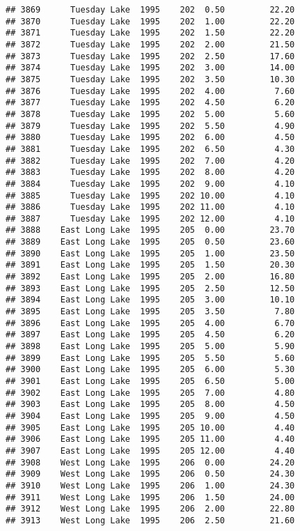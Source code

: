 \documentclass[
]{article}
\begin{document}
\begin{verbatim}
## 3869      Tuesday Lake  1995    202  0.50         22.20
## 3870      Tuesday Lake  1995    202  1.00         22.20
## 3871      Tuesday Lake  1995    202  1.50         22.20
## 3872      Tuesday Lake  1995    202  2.00         21.50
## 3873      Tuesday Lake  1995    202  2.50         17.60
## 3874      Tuesday Lake  1995    202  3.00         14.00
## 3875      Tuesday Lake  1995    202  3.50         10.30
## 3876      Tuesday Lake  1995    202  4.00          7.60
## 3877      Tuesday Lake  1995    202  4.50          6.20
## 3878      Tuesday Lake  1995    202  5.00          5.60
## 3879      Tuesday Lake  1995    202  5.50          4.90
## 3880      Tuesday Lake  1995    202  6.00          4.50
## 3881      Tuesday Lake  1995    202  6.50          4.30
## 3882      Tuesday Lake  1995    202  7.00          4.20
## 3883      Tuesday Lake  1995    202  8.00          4.20
## 3884      Tuesday Lake  1995    202  9.00          4.10
## 3885      Tuesday Lake  1995    202 10.00          4.10
## 3886      Tuesday Lake  1995    202 11.00          4.10
## 3887      Tuesday Lake  1995    202 12.00          4.10
## 3888    East Long Lake  1995    205  0.00         23.70
## 3889    East Long Lake  1995    205  0.50         23.60
## 3890    East Long Lake  1995    205  1.00         23.50
## 3891    East Long Lake  1995    205  1.50         20.30
## 3892    East Long Lake  1995    205  2.00         16.80
## 3893    East Long Lake  1995    205  2.50         12.50
## 3894    East Long Lake  1995    205  3.00         10.10
## 3895    East Long Lake  1995    205  3.50          7.80
## 3896    East Long Lake  1995    205  4.00          6.70
## 3897    East Long Lake  1995    205  4.50          6.20
## 3898    East Long Lake  1995    205  5.00          5.90
## 3899    East Long Lake  1995    205  5.50          5.60
## 3900    East Long Lake  1995    205  6.00          5.30
## 3901    East Long Lake  1995    205  6.50          5.00
## 3902    East Long Lake  1995    205  7.00          4.80
## 3903    East Long Lake  1995    205  8.00          4.50
## 3904    East Long Lake  1995    205  9.00          4.50
## 3905    East Long Lake  1995    205 10.00          4.40
## 3906    East Long Lake  1995    205 11.00          4.40
## 3907    East Long Lake  1995    205 12.00          4.40
## 3908    West Long Lake  1995    206  0.00         24.20
## 3909    West Long Lake  1995    206  0.50         24.30
## 3910    West Long Lake  1995    206  1.00         24.30
## 3911    West Long Lake  1995    206  1.50         24.00
## 3912    West Long Lake  1995    206  2.00         22.80
## 3913    West Long Lake  1995    206  2.50         21.60

\end{verbatim}
\end{document}
